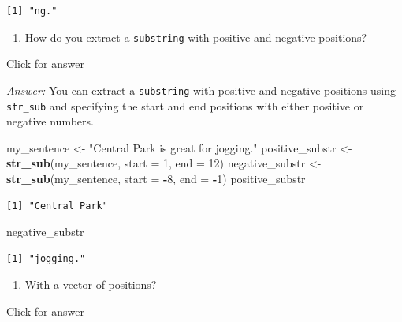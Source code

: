 \documentclass[
]{book}
\newenvironment{Shaded}{\begin{snugshade}}{\end{snugshade}}
\newcommand{\AttributeTok}[1]{\textcolor[rgb]{0.13,0.29,0.53}{#1}}
\newcommand{\DecValTok}[1]{\textcolor[rgb]{0.00,0.00,0.81}{#1}}
\newcommand{\FunctionTok}[1]{\textcolor[rgb]{0.13,0.29,0.53}{\textbf{#1}}}
\newcommand{\NormalTok}[1]{#1}
\newcommand{\OtherTok}[1]{\textcolor[rgb]{0.56,0.35,0.01}{#1}}
\newcommand{\SpecialCharTok}[1]{\textcolor[rgb]{0.81,0.36,0.00}{\textbf{#1}}}
\newcommand{\StringTok}[1]{\textcolor[rgb]{0.31,0.60,0.02}{#1}}
\providecommand{\tightlist}{%
  \setlength{\itemsep}{0pt}\setlength{\parskip}{0pt}}
\begin{document}
\begin{verbatim}
[1] "ng."
\end{verbatim}

\begin{enumerate}
\def\labelenumi{\alph{enumi}.}
\setcounter{enumi}{7}
\tightlist
\item
  How do you extract a \texttt{substring} with positive and negative positions?
\end{enumerate}

Click for answer

\emph{Answer:} You can extract a \texttt{substring} with positive and negative positions using \texttt{str\_sub} and specifying the start and end positions with either positive or negative numbers.

\begin{Shaded}
\begin{Highlighting}[]
\NormalTok{my\_sentence }\OtherTok{\textless{}{-}} \StringTok{"Central Park is great for jogging."}
\NormalTok{positive\_substr }\OtherTok{\textless{}{-}} \FunctionTok{str\_sub}\NormalTok{(my\_sentence, }\AttributeTok{start =} \DecValTok{1}\NormalTok{, }\AttributeTok{end =} \DecValTok{12}\NormalTok{)}
\NormalTok{negative\_substr }\OtherTok{\textless{}{-}} \FunctionTok{str\_sub}\NormalTok{(my\_sentence, }\AttributeTok{start =} \SpecialCharTok{{-}}\DecValTok{8}\NormalTok{, }\AttributeTok{end =} \SpecialCharTok{{-}}\DecValTok{1}\NormalTok{)}
\NormalTok{positive\_substr}
\end{Highlighting}
\end{Shaded}

\begin{verbatim}
[1] "Central Park"
\end{verbatim}

\begin{Shaded}
\begin{Highlighting}[]
\NormalTok{negative\_substr}
\end{Highlighting}
\end{Shaded}

\begin{verbatim}
[1] "jogging."
\end{verbatim}

\begin{enumerate}
\def\labelenumi{\roman{enumi}.}
\tightlist
\item
  With a vector of positions?
\end{enumerate}

Click for answer
\end{document}
